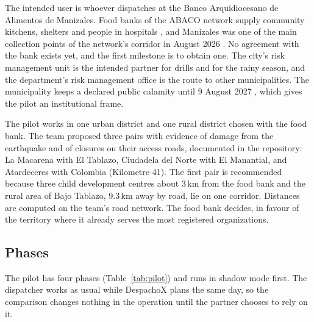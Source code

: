 \documentclass[11pt]{article}
\begin{document}
The intended user is whoever dispatches at the Banco Arquidiocesano de Alimentos de Manizales. Food banks of the ABACO network supply community kitchens, shelters and people in hospitals \citep{larepublica2026abaco}, and Manizales was one of the main collection points of the network's corridor in August 2026 \citep{rcn2026corredor}. No agreement with the bank exists yet, and the first milestone is to obtain one. The city's risk management unit is the intended partner for drills and for the rainy season, and the department's risk management office is the route to other municipalities. The municipality keeps a declared public calamity until 9 August 2027 \citep{alcaldia2026concejo}, which gives the pilot an institutional frame.

The pilot works in one urban district and one rural district chosen with the food bank. The team proposed three pairs with evidence of damage from the earthquake and of closures on their access roads, documented in the repository: La Macarena with El Tablazo, Ciudadela del Norte with El Manantial, and Atardeceres with Colombia (Kilometre 41). The first pair is recommended because three child development centres about 3\,km from the food bank and the rural area of Bajo Tablazo, 9.3\,km away by road, lie on one corridor. Distances are computed on the team's road network. The food bank decides, in favour of the territory where it already serves the most registered organizations.

\subsection{Phases}

The pilot has four phases (Table~\ref{tab:pilot}) and runs in shadow mode first. The dispatcher works as usual while DespachoX plans the same day, so the comparison changes nothing in the operation until the partner chooses to rely on it.
\end{document}
